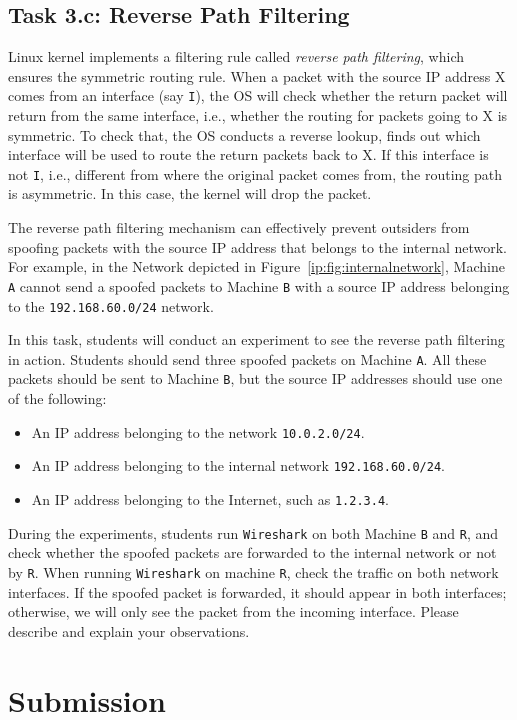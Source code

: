 \subsection{Task 3.c: Reverse Path Filtering}

Linux kernel implements a filtering rule called 
\textit{reverse path filtering},  which ensures the 
symmetric routing rule. When a packet with the source IP address X comes 
from an interface (say \texttt{I}), the OS will check whether the return
packet will return from the same interface, i.e., whether 
the routing for packets going to X is symmetric. 
To check that, the OS conducts a reverse lookup, 
finds out which interface will be used to route the return packets back to X.
If this interface is not \texttt{I}, i.e., different from where the 
original packet comes from, the routing path is asymmetric. In this case,
the kernel will drop the packet. 


The reverse path filtering mechanism can effectively
prevent outsiders from spoofing packets with the source IP 
address that belongs to the internal network. 
For example, in the Network depicted in 
Figure~\ref{ip:fig:internalnetwork}, Machine \texttt{A}
cannot send a spoofed packets to Machine \texttt{B} with a source IP 
address belonging to the \texttt{192.168.60.0/24} network.  


In this task, students will conduct an experiment to 
see the reverse path filtering in action. Students 
should send three spoofed packets on Machine \texttt{A}. 
All these packets should be sent to 
Machine \texttt{B}, but the source IP addresses should use one of 
the following: 


\begin{itemize}[noitemsep]
\item An IP address belonging to the network \texttt{10.0.2.0/24}.  
\item An IP address belonging to the internal network \texttt{192.168.60.0/24}.  
\item An IP address belonging to the Internet, such as \texttt{1.2.3.4}.
\end{itemize}


During the experiments, students run \texttt{Wireshark} on both Machine \texttt{B}
and \texttt{R}, and check whether the spoofed packets are forwarded to the internal network 
or not by \texttt{R}.
When running \texttt{Wireshark} on machine \texttt{R},
check the traffic on both network interfaces. If the spoofed packet
is forwarded, it should appear in both interfaces; otherwise, we will only see 
the packet from the incoming interface. Please describe and explain your observations. 




\section{Submission}

\seedsubmission





